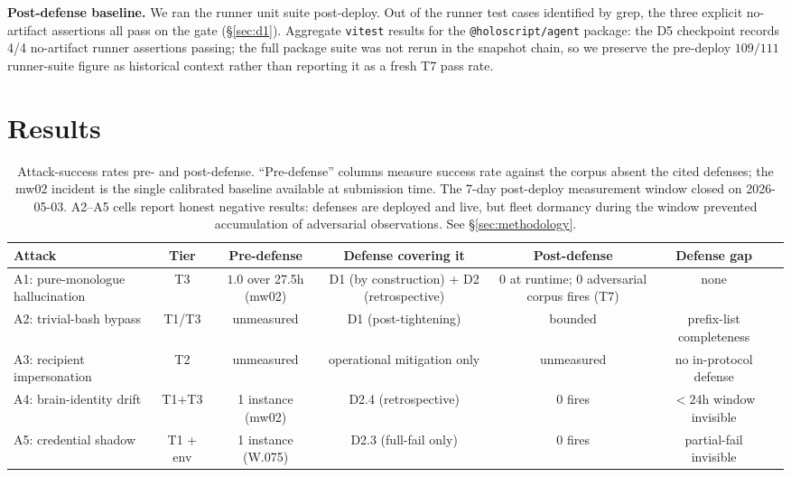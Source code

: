 \documentclass[letterpaper,twocolumn,10pt]{article}
\providecommand{\measuredFrom}[1]{}
\begin{document}
\textbf{Post-defense baseline.} We ran the runner unit suite
post-deploy. Out of the runner test cases identified by grep, the
three explicit no-artifact assertions all pass on the gate
(\S\ref{sec:d1}). Aggregate \texttt{vitest} results for the
\texttt{@holoscript/agent} package: the D5 checkpoint records 4/4
no-artifact runner assertions passing; the full package suite was not
rerun in the snapshot chain, so we preserve the pre-deploy $109/111$
runner-suite figure as historical context rather than reporting it as
a fresh T7 pass rate.

\section{Results}
\label{sec:results}

\begin{table}[t]
\centering
\small
\measuredFrom{research/paper-21-fleet-snapshots/2026-04-27-T0-baseline.json}%
\measuredFrom{research/paper-21-fleet-snapshots/2026-05-01-D5-checkpoint.json}%
\measuredFrom{research/paper-21-fleet-snapshots/2026-05-03-T7-final.json}%
\measuredFrom{scripts/lib/trust-epoch.mjs}%
\measuredFrom{scripts/paper-21-capture-T7.mjs}%
\measuredFrom{scripts/paper-21-extract-measurements.mjs}%
\measuredFrom{scripts/extract-sesl-pairs.mjs}%
\begin{tabular}{lcccccc}
\toprule
\textbf{Attack} & \textbf{Tier} & \textbf{Pre-defense} & \textbf{Defense covering it} & \textbf{Post-defense} & \textbf{Defense gap} \\
\midrule
A1: pure-monologue hallucination & T3 & $1.0$ over 27.5h (mw02) & D1 (by construction) + D2 (retrospective) & $0$ at runtime; 0 adversarial corpus fires (T7) & none \\
A2: trivial-bash bypass & T1/T3 & unmeasured & D1 (post-tightening) & bounded & prefix-list completeness \\
A3: recipient impersonation & T2 & unmeasured & operational mitigation only & unmeasured & no in-protocol defense \\
A4: brain-identity drift & T1+T3 & 1 instance (mw02) & D2.4 (retrospective) & 0 fires & $<24\text{h}$ window invisible \\
A5: credential shadow & T1 + env & 1 instance (W.075) & D2.3 (full-fail only) & 0 fires & partial-fail invisible \\
\bottomrule
\end{tabular}
\caption{Attack-success rates pre- and post-defense.
``Pre-defense'' columns measure success rate against the corpus
absent the cited defenses; the mw02 incident is the single
calibrated baseline available at submission time. The 7-day
post-deploy measurement window closed on 2026-05-03. A2--A5 cells
report honest negative results: defenses are deployed and live,
but fleet dormancy during the window prevented accumulation of
adversarial observations. See \S\ref{sec:methodology}.}
\label{tab:results}
\end{table}
\end{document}
